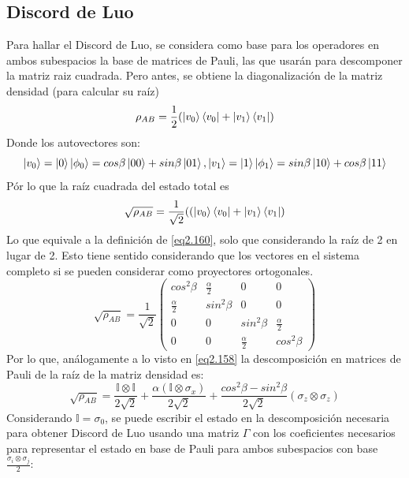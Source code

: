 \documentclass{book}
\begin{document}
\subsection{Discord de Luo}
Para hallar el Discord de Luo, se considera como base para los operadores en ambos subespacios la base de matrices de Pauli, las que usarán para descomponer la matriz raiz cuadrada. Pero antes, se obtiene la diagonalización de la matriz densidad (para calcular su raíz) \begin{equation}\label{eq2.161} \rho_{AB}=\frac{1}{2}(\ket{v_0}\bra{v_0}+\ket{v_1}\bra{v_1})\end{equation}
Donde los autovectores son:
\begin{equation}\label{eq2.162}\ket{v_0}=\ket{0}\ket{\phi_0}=cos\beta\ket{00}+sin\beta\ket{01},\ket{v_1}=\ket{1}\ket{\phi_1}=sin\beta\ket{10}+cos\beta\ket{11}\end{equation}
Pór lo que la raíz cuadrada del estado total es
\begin{equation}\label{eq2.163}\sqrt{\rho_{AB}}=\frac{1}{\sqrt{2}}((\ket{v_0}\bra{v_0}+\ket{v_1}\bra{v_1})\end{equation}
Lo que equivale a la definición de \ref{eq2.160}, solo que considerando la raíz de 2 en lugar de 2. Esto tiene sentido considerando que los vectores en el sistema completo si se pueden considerar como proyectores ortogonales. 
\begin{equation}\label{eq2.164}\sqrt{\rho_{AB}}= \frac{1}{\sqrt{2}} \begin{pmatrix} cos^2 \beta &\frac{\alpha}{2}& 0 & 0 \\  \frac{\alpha}{2}& sin^2 \beta & 0& 0 \\ 0&0 & sin^2 \beta & \frac{\alpha}{2}\\ 0&0 & \frac{\alpha}{2} & cos^2 \beta \end{pmatrix}\end{equation}
Por lo que, análogamente a lo visto en \ref{eq2.158} la descomposición en matrices de Pauli de la raíz de la matriz densidad es:
\begin{equation}\label{eq2.165}\sqrt{\rho_{AB}}=\frac{\mathbb{I}\otimes\mathbb{I}}{2\sqrt{2}}+\frac{\alpha(\mathbb{I}\otimes\sigma_x)}{2\sqrt{2}}+\frac{cos^2\beta-sin^2\beta}{2\sqrt{2}}(\sigma_z\otimes\sigma_z)\end{equation}
Considerando $\mathbb{I}=\sigma_0$, se puede escribir el estado en la descomposición necesaria para obtener Discord de Luo usando una matriz $\Gamma$ con los coeficientes necesarios para representar el estado en base de Pauli para ambos subespacios con base $\frac{\sigma_i\otimes\sigma_j}{2}$:
\end{document}
